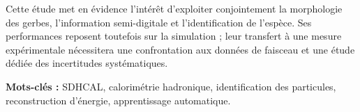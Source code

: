 \documentclass[11pt,a4paper]{report}
\begin{document}
Cette étude met en évidence l’intérêt d’exploiter conjointement la morphologie des gerbes, l’information semi-digitale et l’identification de l’espèce. Ses performances reposent toutefois sur la simulation ; leur transfert à une mesure expérimentale nécessitera une confrontation aux données de faisceau et une étude dédiée des incertitudes systématiques.

\vspace{0.4cm}
\textbf{Mots-clés :} SDHCAL, calorimétrie hadronique, identification des particules, reconstruction d’énergie, apprentissage automatique.




\cleardoublepage
{}








\appendix
{}








\printbibliography
\end{document}
